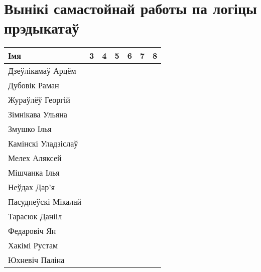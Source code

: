 

\renewcommand\thempfootnote{\arabic{mpfootnote}}


	\section{Вынікі самастойнай работы па логіцы прэдыкатаў}
\begin{table}[H]
	\begin{minipage}{\textwidth}
		\begin{tabular}{|l|c|c|c|c|c|c|}
			\hline
			Імя                     & 3  & 4   & 5   & 6  & 7   & 8  \\ \hline
			Дзеўлікамаў Арцём        &    &     &     &    &     &    \\ \hline
			Дубовік Раман        &    &     &     &    &     &    \\ \hline
			Жураўлёў Георгій     &    &     &     &    &     &    \\ \hline
			Зімнікава Ульяна           &    &     &     &    &     &    \\ \hline
			Змушко Ілья      &    &     &     &    &     &    \\ \hline
			Камінскі Уладзіслаў        &    &     &     &    &     &    \\ \hline
			Мелех Аляксей          &    &     &     &    &     &    \\ \hline
			Мішчанка Ілья       &    &     &     &    &     &    \\ \hline
			Неўдах Дар'я        &    &     &     &    &     &    \\ \hline
			Пасуднеўскі Мікалай        &    &     &     &    &     &    \\ \hline
			Тарасюк Данііл            &    &     &     &    &     &    \\ \hline
			Федаровіч Ян            &    &     &     &    &     &    \\ \hline
			Хакімі Рустам            &    &     &     &    &     &    \\ \hline
			Юхневіч Паліна            &    &     &     &    &     &    \\ \hline
		\end{tabular}
	\end{minipage}
\end{table}


